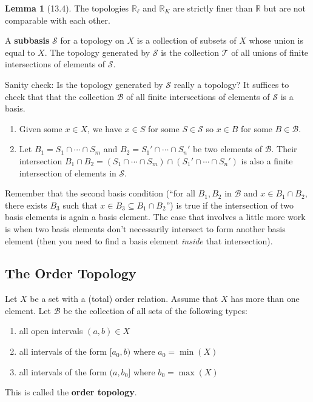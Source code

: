 \documentclass{article}
\newcommand{\nline}{\vspace*{0.5\baselineskip}}
\theoremstyle{definition}
\newtheorem{lemma}{Lemma}[subsection]
\begin{document}
\begin{flushleft}
\begin{lemma}[13.4]
The topologies $\mathbb{R}_\ell$ and $\mathbb{R}_K$ are strictly finer than $\mathbb{R}$ but are not comparable with each other.
\end{lemma}

A \textbf{subbasis} $\mathcal{S}$ for a topology on $X$ is a collection of subsets of $X$ whose union is equal to $X$. The topology generated by $\mathcal{S}$ is the collection $\mathcal{T}$ of all unions of finite intersections of elements of $\mathcal{S}$.

\nline

Sanity check: Is the topology generated by $\mathcal{S}$ really a topology? It suffices to check that that the collection $\mathcal{B}$ of all finite intersections of elements of $\mathcal{S}$ is a basis.

\begin{enumerate}
    \item Given some $x \in X$, we have $x \in S$ for some $S \in \mathcal{S}$ so $x \in B$ for some $B \in \mathcal{B}$.
    \item Let $B_1 = S_1 \cap \cdots \cap S_m$ and $B_2 = S_1' \cap \cdots \cap S_n'$ be two elements of $\mathcal{B}$. Their intersection $B_1 \cap B_2 = (S_1 \cap \cdots \cap S_m) \cap (S_1' \cap \cdots \cap S_n')$ is also a finite intersection of elements in $\mathcal{S}$.
\end{enumerate}

Remember that the second basis condition (``for all $B_1,B_2$ in $\mathcal{B}$ and $x \in B_1 \cap B_2$, there exists $B_3$ such that $x \in B_3 \subseteq B_1 \cap B_2$'') is true if the intersection of two basis elements is again a basis element. The case that involves a little more work is when two basis elements don't necessarily intersect to form another basis element (then you need to find a basis element \textit{inside} that intersection).

\subsection{The Order Topology}

Let $X$ be a set with a (total) order relation. Assume that $X$ has more than one element. Let $\mathcal{B}$ be the collection of all sets of the following types:
\begin{enumerate}
    \item all open intervals $(a,b) \in X$
    \item all intervals of the form $[a_0,b)$ where $a_0 = \min(X)$
    \item all intervals of the form $(a,b_0]$ where $b_0 = \max(X)$
\end{enumerate}
This is called the \textbf{order topology}.


\end{flushleft}
\end{document}
